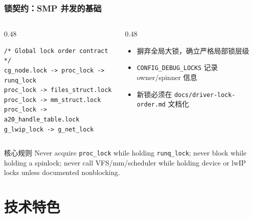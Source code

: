 \documentclass[aspectratio=1610]{beamer}
\newcommand{\code}[1]{\texttt{\footnotesize #1}}
\begin{document}
\begin{frame}[fragile]
    \frametitle{锁契约：SMP 并发的基础}
    \begin{columns}
        \begin{column}{0.48\textwidth}
            \begin{lstlisting}[basicstyle=\ttfamily\tiny]
/* Global lock order contract */
cg_node.lock -> proc_lock -> runq_lock
proc_lock -> files_struct.lock
proc_lock -> mm_struct.lock
proc_lock -> a20_handle_table.lock
g_lwip_lock -> g_net_lock
            \end{lstlisting}
        \end{column}
        \begin{column}{0.48\textwidth}
            \footnotesize
            \begin{itemize}
                \item 摒弃全局大锁，确立严格局部锁层级
                \item \code{CONFIG\_DEBUG\_LOCKS} 记录 owner/spinner 信息
                \item 新锁必须在 \code{docs/driver-lock-order.md} 文档化
            \end{itemize}
        \end{column}
    \end{columns}
    \vspace{0.3em}
    \begin{block}{核心规则}
        \footnotesize
        Never acquire \code{proc\_lock} while holding \code{runq\_lock}; never block while holding a spinlock; never call VFS/mm/scheduler while holding device or lwIP locks unless documented nonblocking.
    \end{block}
\end{frame}

\section{技术特色}
\end{document}
